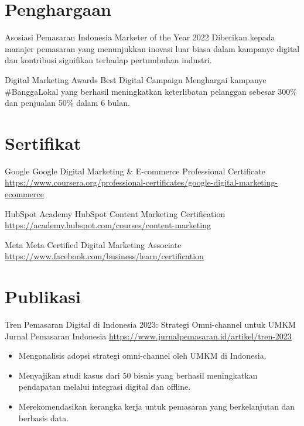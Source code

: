 \documentclass[a4paper, serif, 10pt]{moderncv}
\begin{document}
\section{Penghargaan}

        {Asosiasi Pemasaran Indonesia}
        {Marketer of the Year 2022}
        {}
        {}
        {Diberikan kepada manajer pemasaran yang menunjukkan inovasi luar biasa dalam kampanye digital dan kontribusi signifikan terhadap pertumbuhan industri.}

        {Digital Marketing Awards}
        {Best Digital Campaign}
        {}
        {}
        {Menghargai kampanye \#BanggaLokal yang berhasil meningkatkan keterlibatan pelanggan sebesar 300\% dan penjualan 50\% dalam 6 bulan.}
\section{Sertifikat}

        {Google}
        {Google Digital Marketing \& E-commerce Professional Certificate}
        {\url{https://www.coursera.org/professional-certificates/google-digital-marketing-ecommerce}}
        {}
        {}

        {HubSpot Academy}
        {HubSpot Content Marketing Certification}
        {\url{https://academy.hubspot.com/courses/content-marketing}}
        {}
        {}

        {Meta}
        {Meta Certified Digital Marketing Associate}
        {\url{https://www.facebook.com/business/learn/certification}}
        {}
        {}
\section{Publikasi}

        {Tren Pemasaran Digital di Indonesia 2023: Strategi Omni-channel untuk UMKM}
        {Jurnal Pemasaran Indonesia}
        {\url{https://www.jurnalpemasaran.id/artikel/tren-2023}}
        {}
        {\begin{itemize}
\item Menganalisis adopsi strategi omni-channel oleh UMKM di Indonesia.
\item Menyajikan studi kasus dari 50 bisnis yang berhasil meningkatkan pendapatan melalui integrasi digital dan offline.
\item Merekomendasikan kerangka kerja untuk pemasaran yang berkelanjutan dan berbasis data.
\end{itemize}}
\end{document}
